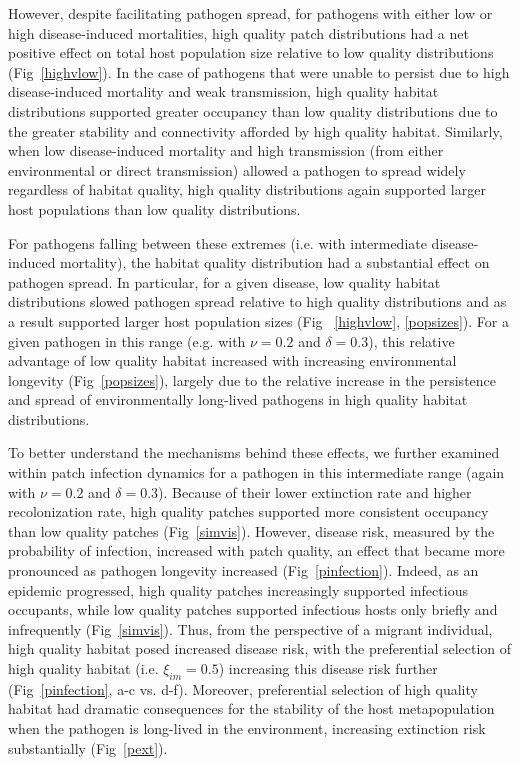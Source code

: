 \documentclass{article}
\begin{document}
However, despite facilitating pathogen spread, for pathogens with either low or high disease-induced mortalities, high quality patch distributions had a net positive effect on total host population size relative to low quality distributions (Fig~\ref{highvlow}).  
In the case of pathogens that were unable to persist due to high disease-induced mortality and weak transmission, high quality habitat distributions supported greater occupancy than low quality distributions due to the greater stability and connectivity afforded by high quality habitat.
Similarly, when low disease-induced mortality and high transmission (from either environmental or direct transmission) allowed a pathogen to spread widely regardless of habitat quality, high quality distributions again supported larger host populations than low quality distributions.

For pathogens falling between these extremes (i.e. with intermediate disease-induced mortality), the habitat quality distribution had a substantial effect on pathogen spread.  
In particular, for a given disease, low quality habitat distributions slowed pathogen spread relative to high quality distributions and as a result supported larger host population sizes (Fig ~\ref{highvlow}, \ref{popsizes}).  
For a given pathogen in this range (e.g. with $\nu = 0.2$ and $\delta = 0.3$), this relative advantage of low quality habitat increased with increasing environmental longevity (Fig~\ref{popsizes}), largely due to the relative increase in the persistence and spread of environmentally long-lived pathogens in high quality habitat distributions.

To better understand the mechanisms behind these effects, we further examined within patch infection dynamics for a pathogen in this intermediate range (again with $\nu = 0.2$ and $\delta = 0.3$).  
Because of their lower extinction rate and higher recolonization rate, high quality patches supported more consistent occupancy than low quality patches (Fig~\ref{simvis}).  
However, disease risk, measured by the probability of infection, increased with patch quality, an effect that became more pronounced as pathogen longevity increased (Fig~\ref{pinfection}).
Indeed, as an epidemic progressed, high quality patches increasingly supported infectious occupants, while low quality patches supported infectious hosts only briefly and infrequently (Fig~\ref{simvis}).  
Thus, from the perspective of a migrant individual, high quality habitat posed increased disease risk, with the preferential selection of high quality habitat (i.e. $\xi_{im} = 0.5$) increasing this disease risk further (Fig~\ref{pinfection}, a-c vs. d-f).
Moreover, preferential selection of high quality habitat had dramatic consequences for the stability of the host metapopulation when the pathogen is long-lived in the environment, increasing extinction risk substantially (Fig~\ref{pext}).
\end{document}
